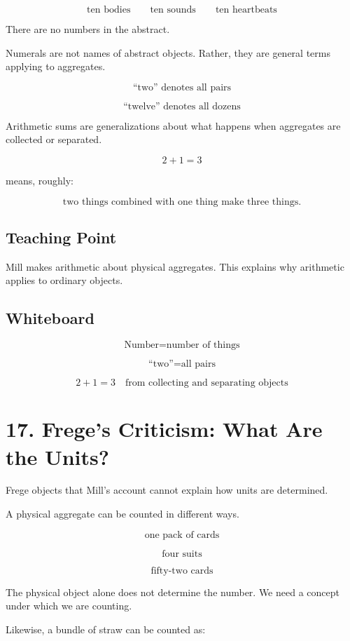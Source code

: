 \documentclass[11pt]{article}
\begin{document}
\[
\text{ten bodies}
\qquad
\text{ten sounds}
\qquad
\text{ten heartbeats}
\]

There are no numbers in the abstract.

Numerals are not names of abstract objects. Rather, they are general terms applying to
aggregates.

\[
\text{``two'' denotes all pairs}
\]

\[
\text{``twelve'' denotes all dozens}
\]

Arithmetic sums are generalizations about what happens when aggregates are collected or
separated.

\[
2+1=3
\]

means, roughly:

\[
\text{two things combined with one thing make three things.}
\]

\subsection*{Teaching Point}

Mill makes arithmetic about physical aggregates. This explains why arithmetic applies to
ordinary objects.

\subsection*{Whiteboard}

\[
\text{Number} = \text{number of things}
\]

\[
\text{``two''} = \text{all pairs}
\]

\[
2+1=3
\quad
\text{from collecting and separating objects}
\]

\section*{17. Frege's Criticism: What Are the Units?}

Frege objects that Mill's account cannot explain how units are determined.

A physical aggregate can be counted in different ways.

\[
\text{one pack of cards}
\]

\[
\text{four suits}
\]

\[
\text{fifty-two cards}
\]

The physical object alone does not determine the number. We need a concept under which
we are counting.

Likewise, a bundle of straw can be counted as:
\end{document}
